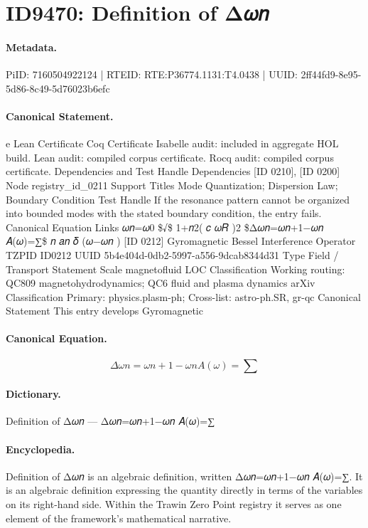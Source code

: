 \section*{ID9470: Definition of Δ𝜔𝑛}
\paragraph{Metadata.}
PiID: 7160504922124 | RTEID: RTE:P36774.1131:T4.0438 | UUID: 2ff44fd9-8e95-5d86-8c49-5d76023b6efc

\paragraph{Canonical Statement.}
e Lean Certificate Coq Certificate Isabelle audit: included in aggregate HOL build. Lean audit: compiled corpus certificate. Rocq audit: compiled corpus certificate. Dependencies and Test Handle Dependencies [ID 0210], [ID 0200] Node registry\_id\_0211 Support Titles Mode Quantization; Dispersion Law; Boundary Condition Test Handle If the resonance pattern cannot be organized into bounded modes with the stated boundary condition, the entry fails. Canonical Equation Links 𝜔𝑛=𝜔0 \$√\$ 1+𝑛2( 𝑐 𝜔𝑅 )2 \$Δ𝜔𝑛=𝜔𝑛+1−𝜔𝑛 𝐴(𝜔)=∑\$ 𝑛 𝑎𝑛 𝛿 (𝜔−𝜔𝑛 ) [ID 0212] Gyromagnetic Bessel Interference Operator TZPID ID0212 UUID 5b4e404d-0db2-5997-a556-9dcab8344d31 Type Field / Transport Statement Scale magnetofluid LOC Classification Working routing: QC809 magnetohydrodynamics; QC6 fluid and plasma dynamics arXiv Classification Primary: physics.plasm-ph; Cross-list: astro-ph.SR, gr-qc Canonical Statement This entry develops Gyromagnetic

\paragraph{Canonical Equation.}
\[
Δ𝜔𝑛=𝜔𝑛+1−𝜔𝑛 𝐴(𝜔)=∑
\]

\paragraph{Dictionary.}
Definition of Δ𝜔𝑛 — Δ𝜔𝑛=𝜔𝑛+1−𝜔𝑛 𝐴(𝜔)=∑

\paragraph{Encyclopedia.}
Definition of Δ𝜔𝑛 is an algebraic definition, written Δ𝜔𝑛=𝜔𝑛+1−𝜔𝑛 𝐴(𝜔)=∑. It is an algebraic definition expressing the quantity directly in terms of the variables on its right-hand side. Within the Trawin Zero Point registry it serves as one element of the framework's mathematical narrative.
